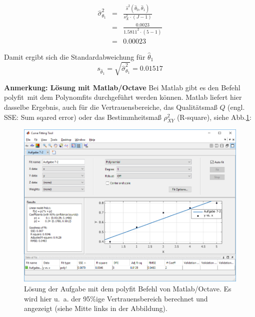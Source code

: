 \begin{eqnarray}
\hat\sigma^2_{\theta_1} &=& \frac{ \hat s^2(\hat{\theta}_0 ,\hat{\theta}_1 )}
{s^2_X \cdot (J- 1) }
\nonumber \\
&=& \frac{ 0.0023}
{1.5811^2 \cdot (5- 1) } \nonumber \\
&=& 0.00023
\end{eqnarray}

Damit ergibt sich die Standardabweichung für $\hat\theta_1$
\[
s_{\hat\theta_1} = \sqrt{\hat\sigma_{\theta_1}^2} = 0.01517
\]

\newpage
\textbf{Anmerkung: Lösung mit Matlab/Octave} 
Bei Matlab gibt es den Befehl \glqq polyfit\grqq ~mit dem Polynomfits durchgeführt werden können. Matlab liefert hier dasselbe Ergebnis, auch für die Vertrauensbereiche, das Qualitätsmaß $Q$ (engl. SSE: Sum sqared error) oder das Bestimmheitsmaß $\rho^2_{XY}$ (R-square), siehe Abb.\ref{fig:MatlabPolyfit}:
\begin{figure}[!htp]
	\begin{center}
		\includegraphics[width=160mm]{03_vorlesung/media/Matlab_CFTool.png}
		\caption{Lösung der Aufgabe mit dem polyfit Befehl von Matlab/Octave. 
		Es wird hier u.~a. der 95\%ige Vertrauensbereich berechnet und
		angezeigt (siehe Mitte links in der Abbildung).}
		\label{fig:MatlabPolyfit}
	\end{center}
\end{figure}

